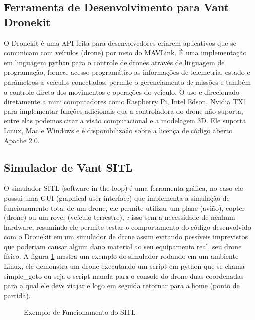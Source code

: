 \subsection{Ferramenta de Desenvolvimento para Vant Dronekit}
O Dronekit é uma API feita para desenvolvedores criarem aplicativos que se comunicam com veículos (drone) por meio do MAVLink. É uma implementação em linguagem python para o controle de drones através de linguagem de programação, fornece acesso programático as informações de telemetria, estado e parâmetros a veículos conectados, permite o gerenciamento de missões e também o controle direto dos movimentos e operações do veículo.
O uso e direcionado diretamente a mini computadores como Raspberry Pi, Intel Edson, Nvidia TX1 para implementar funções adicionais que a controladora do drone não suporta, entre elas podemos citar a visão computacional e a modelagem 3D. Ele suporta Linux, Mac e Windows e é disponibilizado sobre a licença de código aberto Apache 2.0.

\subsection{Simulador de Vant SITL}
O simulador SITL (software in the loop) é uma ferramenta gráfica, no caso ele possui uma GUI (graphical user interface) que implementa a simulação de funcionamento total de um drone, ele permite utilizar um plane (avião), copter (drone) ou um rover (veículo terrestre), e isso sem a necessidade de nenhum hardware, resumindo ele permite testar o comportamento do código desenvolvido com o Dronekit em um simulador de drone assim evitando possíveis imprevistos que poderiam causar algum dano material ao seu equipamento real, seu drone físico. A figura \ref{fig:sitl} mostra um exemplo do simulador rodando em um ambiente Linux, ele demonstra um drone executando um script em python que se chama simple\_goto ou seja o script manda para o console do drone duas coordenadas para a qual ele deve viajar e logo em seguida retornar para a home (ponto de partida).

%
\begin{figure}[H]
	\centering
	\caption{Exemplo de Funcionamento do SITL}
	\fontsize{9pt}{12pt}\selectfont
	\def\svgwidth{15cm}
	
	\label{fig:sitl}
\end{figure}

